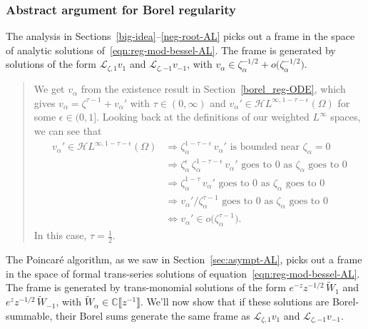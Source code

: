 \documentclass{article}
\theoremstyle{definition}
\newcommand{\C}{\mathbb{C}}
\newcommand{\holoL}[1]{\mathcal{H}L^{#1}} %
\newcommand{\laplace}{\mathcal{L}}
\begin{document}
\subsubsection{Abstract argument for Borel regularity}\label{bessel-regularity-AL}
The analysis in Sections~\ref{big-idea}--\ref{neg-root-AL} picks out a frame in the space of analytic solutions of~\eqref{eqn:reg-mod-bessel-AL}. The frame is generated by solutions of the form $\laplace_{\zeta, 1} v_1$ and $\laplace_{\zeta, -1} v_{-1}$, with $v_\alpha \in \zeta_\alpha^{-1/2} + o\big(\zeta_\alpha^{-1/2}\big)$.
\color{DarkTurquoise}
\begin{quote}
We get $v_\alpha$ from the existence result in Section~\ref{borel_reg-ODE}, which gives $v_\alpha = \zeta^{\tau-1} + v_\alpha'$ with $\tau \in (0, \infty)$ and $v_\alpha' \in \holoL{\infty, 1-\tau-\epsilon}(\Omega)$ for some $\epsilon \in (0, 1]$. Looking back at the definitions of our weighted $L^\infty$ spaces, we can see that
\begin{align*}
v_\alpha' \in \holoL{\infty, 1-\tau-\epsilon}(\Omega) & \Longrightarrow \zeta_\alpha^{1-\tau-\epsilon}\,v_\alpha' \text{ is bounded near } \zeta_\alpha = 0 \\
& \Longrightarrow \zeta_\alpha^\epsilon\,\zeta_\alpha^{1-\tau-\epsilon}\,v_\alpha' \text{ goes to } 0 \text{ as } \zeta_\alpha \text{ goes to } 0 \\
& \Longrightarrow \zeta_\alpha^{1-\tau}\,v_\alpha' \text{ goes to } 0 \text{ as } \zeta_\alpha \text{ goes to } 0 \\
& \Longrightarrow v_\alpha' / \zeta_\alpha^{\tau-1} \text{ goes to } 0 \text{ as } \zeta_\alpha \text{ goes to } 0 \\
& \Longleftrightarrow v_\alpha' \in o\big(\zeta_\alpha^{\tau-1}\big).
\end{align*}
In this case, $\tau = \tfrac{1}{2}$.
\end{quote}
\color{black}

The Poincar\'{e} algorithm, as we saw in Section~\ref{sec:asympt-AL}, picks out a frame in the space of formal trans-series solutions of equation~\eqref{eqn:reg-mod-bessel-AL}. The frame is generated by trans-monomial solutions of the form $e^{-z} z^{-1/2}\,\tilde{W}_1$ and $e^z z^{-1/2}\,\tilde{W}_{-1}$, with $\tilde{W}_\alpha \in \C\llbracket z^{-1} \rrbracket$. We'll now show that if these solutions are Borel-summable, their Borel sums generate the same frame as $\laplace_{\zeta, 1} v_1$ and $\laplace_{\zeta, -1} v_{-1}$.
\end{document}
